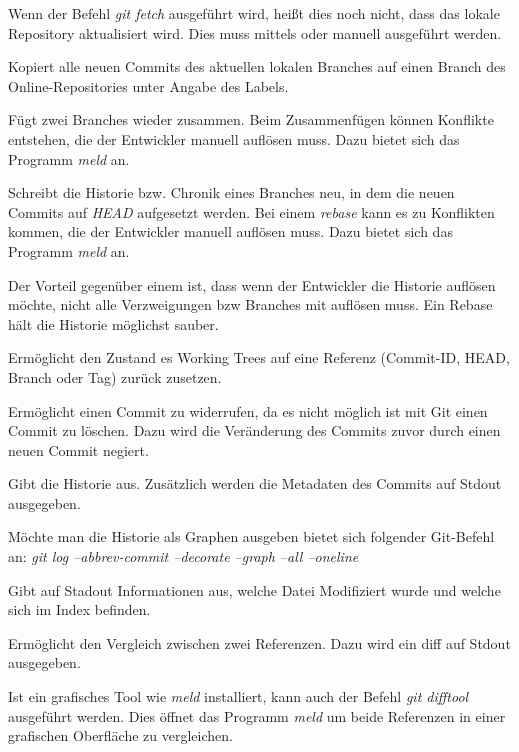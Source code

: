 \begin{INFO}
  Wenn der Befehl \textit{git fetch} ausgeführt wird, heißt dies noch nicht, dass das lokale Repository aktualisiert wird. Dies muss mittels \textit{} oder \textit{} manuell ausgeführt werden.
\end{INFO}

\label{git-commands.advanced.push}
Kopiert alle neuen Commits des aktuellen lokalen Branches auf einen Branch des Online-Repositories unter Angabe des Labels.

\label{git-commands.advanced.merge}
Fügt zwei Branches wieder zusammen. Beim Zusammenfügen können Konflikte entstehen, die der Entwickler manuell auflösen muss. Dazu bietet sich das Programm \textit{meld} an.

\label{git-commands.advanced.rebase}
Schreibt die Historie bzw. Chronik eines Branches neu, in dem die neuen Commits auf \textit{HEAD} aufgesetzt werden. Bei einem \textit{rebase} kann es zu Konflikten kommen, die der Entwickler manuell auflösen muss. Dazu bietet sich das Programm \textit{meld} an. 

Der Vorteil gegenüber einem \textit{} ist, dass wenn der Entwickler die Historie auflösen möchte, nicht alle Verzweigungen bzw Branches mit auflösen muss. Ein Rebase hält die Historie möglichst sauber.

\label{git-commands.advanced.reset}
Ermöglicht den Zustand es Working Trees auf eine Referenz (Commit-ID, HEAD, Branch oder Tag) zurück zusetzen.

\label{git-commands.advanced.revert}
Ermöglicht einen Commit zu widerrufen, da es nicht möglich ist mit Git einen Commit zu löschen. Dazu wird die Veränderung des Commits zuvor durch einen neuen Commit negiert.

\label{git-commands.advanced.log}
Gibt die Historie aus. Zusätzlich werden die Metadaten des Commits auf Stdout ausgegeben. 

\begin{INFO}
  Möchte man die Historie als Graphen ausgeben bietet sich folgender Git-Befehl an: \textit{git log --abbrev-commit --decorate --graph --all --oneline}
\end{INFO}

\label{git-commands.advanced.status}
Gibt auf Stadout Informationen aus, welche Datei Modifiziert wurde und welche sich im Index befinden.

\label{git-commands.advanced.diff}
Ermöglicht den Vergleich zwischen zwei Referenzen. Dazu wird ein diff auf Stdout ausgegeben.

\begin{INFO}
  Ist ein grafisches Tool wie \textit{meld} installiert, kann auch der Befehl \textit{git difftool} ausgeführt werden. Dies öffnet das Programm \textit{meld} um beide Referenzen in einer grafischen Oberfläche zu vergleichen.
\end{INFO}
